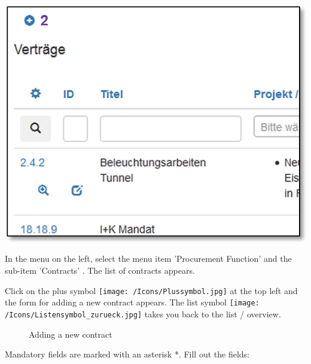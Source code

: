 \begin{center}
\hspace{-55mm}   
\includegraphics[width=.4\linewidth]{../chapters/07_Beschaffungswesen/pictures/7-1-8_NeuerVertrag.jpg}
\end{center}

\vspace{\baselineskip}

In the menu on the left, select the menu item 'Procurement Function' and the sub-item 'Contracts' . The list of contracts appears.

\vspace{\baselineskip}

Click on the plus symbol \texttt{[image: /Icons/Plussymbol.jpg]}  at the top left and the form for adding a new contract appears. The list symbol \texttt{[image: /Icons/Listensymbol\_zurueck.jpg]}  takes you back to the list / overview.

\begin{figure}[H]
\caption{Adding a new contract}
\end{figure}

Mandatory fields are marked with an asterisk *. Fill out the fields:

\vspace{\baselineskip}


